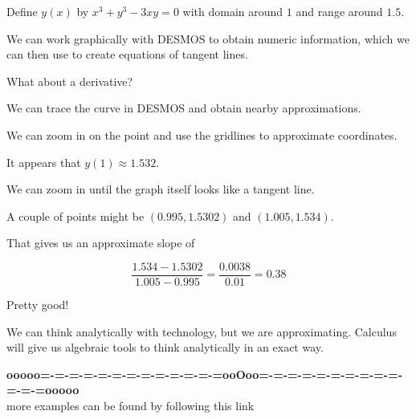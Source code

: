 \documentclass{ximera}
\begin{document}
\begin{example}

Define $y(x)$ by $x^3 + y^3 - 3 x y = 0$ with domain around $1$ and range around $1.5$.


We can work graphically with DESMOS to obtain numeric information, which we can then use to create equations of tangent lines.







\begin{center}
\end{center}



What about a derivative?

We can trace the curve in DESMOS and obtain nearby approximations.


We can zoom in on the point and use the gridlines to approximate coordinates.






\begin{center}
\end{center}

It appears that $y(1) \approx 1.532$.



We can zoom in until the graph itself looks like a tangent line.



\begin{center}
\end{center}

A couple of points might be $(0.995, 1.5302)$ and $(1.005, 1.534)$.

That gives us an approximate slope of 

\[
\frac{1.534 - 1.5302}{1.005 - 0.995} = \frac{0.0038}{0.01} = 0.38
\]


Pretty good!


\end{example}



We can think analytically with technology, but we are approximating.  Calculus will give us algebraic tools to think analytically in an exact way.






\begin{center}
\textbf{\textcolor{green!50!black}{ooooo=-=-=-=-=-=-=-=-=-=-=-=-=ooOoo=-=-=-=-=-=-=-=-=-=-=-=-=ooooo}} \\

more examples can be found by following this link\\ 

\end{center}
\end{document}
